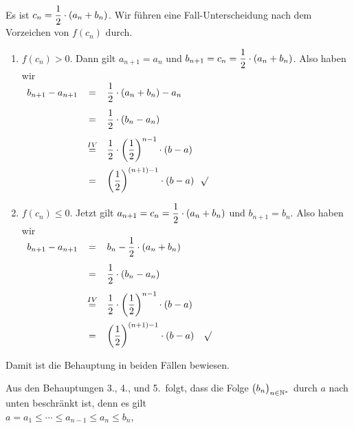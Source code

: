 \begin{enumerate}
      Es ist $\displaystyle c_n = \frac{1}{2} \cdot (a_n + b_n)$.   Wir f\"uhren eine 
      Fall-Unterscheidung nach dem Vorzeichen von $f(c_n)$ durch.
      \begin{enumerate}
      \item $f(c_n) > 0$.  Dann gilt $a_{n+1} = a_n$ und 
            $\displaystyle b_{n+1} = c_n = \frac{1}{2} \cdot(a_n + b_n)$.
            Also haben wir      
            \\[0.2cm]
            \hspace*{1.3cm}
            $
            \begin{array}[b]{lcl}
              b_{n+1} - a_{n+1} & = & \displaystyle\frac{1}{2}\cdot(a_n + b_n) - a_n \\[0.4cm]
                               & = & \displaystyle\frac{1}{2}\cdot(b_n - a_n)       \\[0.4cm]  
                  & \stackrel{IV}{=} & \displaystyle\frac{1}{2}\cdot\left(\frac{1}{2}\right)^{n-1}\cdot(b - a) \\[0.4cm]  
                                & = & \displaystyle\left(\frac{1}{2}\right)^{(n+1) - 1}\cdot(b - a) 
            \end{array}
            $$\surd$
      \item $f(c_n) \leq 0$.  Jetzt gilt $\displaystyle a_{n+1} = c_n = \frac{1}{2}\cdot(a_n + b_n)$ und 
            $b_{n+1} = b_n$.
            Also haben wir      
            \\[0.2cm]
            \hspace*{1.3cm}
            $
            \begin{array}[b]{lcl}
              b_{n+1} - a_{n+1} & = & \displaystyle b_n - \frac{1}{2}\cdot(a_n + b_n) \\[0.4cm]
                                & = & \displaystyle\frac{1}{2}\cdot(b_n - a_n)       \\[0.4cm]  
                  & \stackrel{IV}{=} & \displaystyle\frac{1}{2}\cdot\left(\frac{1}{2}\right)^{n-1}\cdot(b - a) \\[0.4cm]  
                                & = & \displaystyle\left(\frac{1}{2}\right)^{(n+1)-1}\cdot(b - a) 
            \end{array}
            $ $\surd$
      \end{enumerate}
      Damit ist die Behauptung in beiden F\"allen bewiesen.
\end{enumerate}
Aus den Behauptungen 3., 4., und 5.~folgt, dass die Folge $\bigl(b_n\bigr)_{n\in\mathbb{N}^*}$ durch $a$ nach unten
beschr\"ankt ist, denn es gilt
\\[0.2cm]
\hspace*{1.3cm} $a = a_1 \leq \cdots \leq a_{n-1} \leq a_n \leq b_n$, \quad

